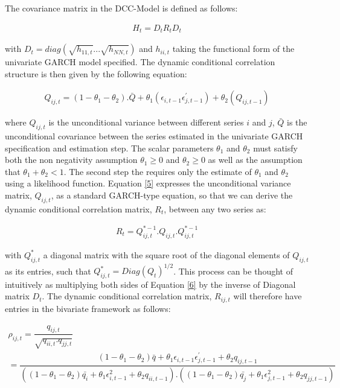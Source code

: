 \documentclass[11pt,preprint, authoryear]{elsarticle}
\numberwithin{equation}{section}
\numberwithin{figure}{section}
\numberwithin{table}{section}
\begin{document}
The covariance matrix in the DCC-Model is defined as follows:

\begin{align}
  H_t = D_tR_tD_t \label{eq4}
\end{align}

with \(D_t = diag(\sqrt{h_{11,t}}...\sqrt{h_{NN,t}})\) and \(h_{ii,t}\)
taking the functional form of the univariate GARCH model specified. The
dynamic conditional correlation structure is then given by the following
equation:

\begin{align}
  Q_{ij,t} = (1 - \theta_1 - \theta_2).\bar{Q} + \theta_1(\epsilon_{i,t-1}\epsilon_{j,t-1}^{'}) + \theta_2(Q_{ij,t-1})  \label{eq5}
\end{align}

where \(Q_{ij,t}\) is the unconditional variance between different
series \(i\) and \(j\), \(\bar{Q}\) is the unconditional covariance
between the series estimated in the univariate GARCH specification and
estimation step. The scalar parameters \(\theta_1\) and \(\theta_2\)
must satisfy both the non negativity assumption \(\theta_1 \geq 0\) and
\(\theta_2 \geq 0\) as well as the assumption that
\(\theta_1 + \theta_2 < 1\). The second step the requires only the
estimate of \(\theta_1\) and \(\theta_2\) using a likelihood function.
Equation \ref{5} expresses the unconditional variance matrix,
\(Q_{ij,t}\), as a standard GARCH-type equation, so that we can derive
the dynamic conditional correlation matrix, \(R_t\), between any two
series as:

\begin{align}
  R_t = Q_{ij,t}^{*-1}. Q_{ij,t}. Q_{ij,t}^{*-1} \label{eq6}
\end{align}

with \(Q_{ij,t}^{*}\) a diagonal matrix with the square root of the
diagonal elements of \(Q_{ij,t}\) as its entries, such that
\(Q_{ij,t}^{*} = Diag(Q_t)^{1/2}\). This process can be thought of
intuitively as multiplying both sides of Equation \ref{6} by the inverse
of Diagonal matrix \(D_t\). The dynamic conditional correlation matrix,
\(R_{ij,t}\) will therefore have entries in the bivariate framework as
follows:

\begin{align}
  \rho_{ij,t} = \dfrac{q_{ij,t}}{\sqrt{q_{ii,t}.q_{jj,t}}} \\ 
  = \dfrac{(1 - \theta_1 - \theta_2) \bar{q} + \theta_1 \epsilon_{i,t-1} \epsilon_{j,t-1}^{'} + \theta_2 q_{ij,t-1}}{((1 - \theta_1 - \theta_2)\bar{q_i} + \theta_1     \epsilon_{i,t-1}^2 + \theta_2 q_{ii,t-1}) . ((1 - \theta_1 - \theta_2) \bar{q_{j}} + \theta_1 \epsilon_{j,t-1}^2 + \theta_2 q_{jj,t-1})} \label{eq7}
\end{align}
\end{document}
